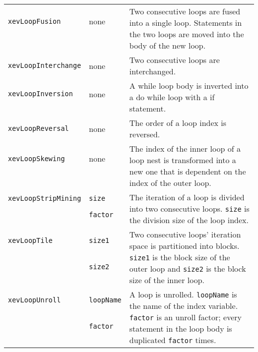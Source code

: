 \begin{longtable}[l]{l|l|l}

\texttt{xevLoopFusion} & none & \multirow{3}{9cm}{Two consecutive loops are
 fused into a single loop. Statements in the two loops are moved into
 the body of the new loop.} \\
 &&\\ &&\\ \hline

\texttt{xevLoopInterchange} & none & \multirow{1}{9cm}{Two
 consecutive loops are interchanged.} \\
\hline

\texttt{xevLoopInversion} & none & \multirow{2}{9cm}{A while loop body is
inverted into a do while loop with a if statement.} \\
&&\\ \hline

\texttt{xevLoopReversal} & none & \multirow{1}{9cm}{The order of a loop index
is reversed.} \\
\hline

\texttt{xevLoopSkewing} & none & \multirow{3}{9cm}{The index of the inner loop of
a loop nest is transformed into a new one that is dependent on the index of the outer loop.} \\
 &&\\ &&\\ \hline

\texttt{xevLoopStripMining} & \texttt{size} & \multirow{3}{9cm}{The iteration
of a loop is divided into two consecutive loops. \texttt{size} is
the division size of the loop index.} \\ &
 \texttt{factor} & \\ &&\\ \hline

\texttt{xevLoopTile} & \texttt{size1} & \multirow{3}{9cm}{
Two consecutive loops' iteration space is partitioned into blocks. \texttt{size1} is
 the block size of the outer loop and  \texttt{size2} is the block size of the inner loop.} \\
& \texttt{size2} &\\
&  &\\ \hline

\texttt{xevLoopUnroll} & \texttt{loopName} & \multirow{3}{9cm}{A loop is
 unrolled. \texttt{loopName} is the name of the index
 variable. \texttt{factor} is an unroll factor; every
 statement in the loop body is duplicated \texttt{factor} times.} \\ &
 \texttt{factor} & \\ &&\\ \hline


\end{longtable}
